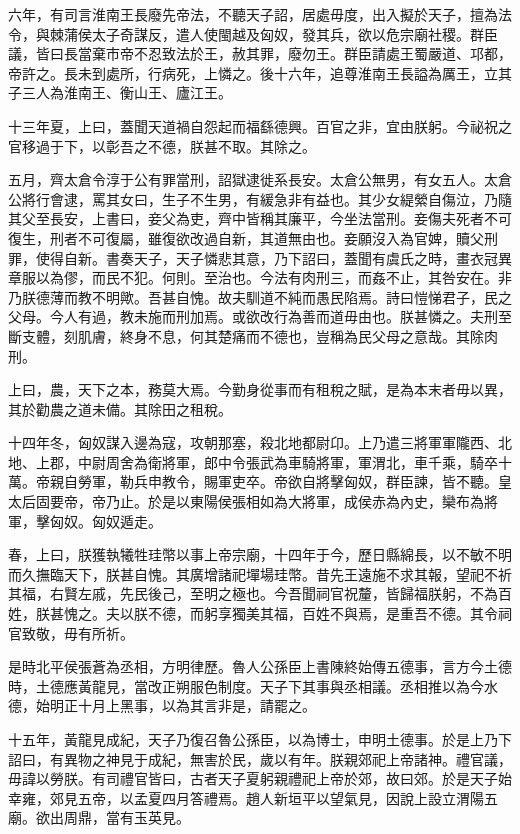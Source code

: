 六年，有司言淮南王長廢先帝法，不聽天子詔，居處毋度，出入擬於天子，擅為法令，與棘蒲侯太子奇謀反，遣人使閩越及匈奴，發其兵，欲以危宗廟社稷。群臣議，皆曰長當棄市帝不忍致法於王，赦其罪，廢勿王。群臣請處王蜀嚴道、邛都，帝許之。長未到處所，行病死，上憐之。後十六年，追尊淮南王長謚為厲王，立其子三人為淮南王、衡山王、廬江王。

十三年夏，上曰，蓋聞天道禍自怨起而福繇德興。百官之非，宜由朕躬。今祕祝之官移過于下，以彰吾之不德，朕甚不取。其除之。

五月，齊太倉令淳于公有罪當刑，詔獄逮徙系長安。太倉公無男，有女五人。太倉公將行會逮，罵其女曰，生子不生男，有緩急非有益也。其少女緹縈自傷泣，乃隨其父至長安，上書曰，妾父為吏，齊中皆稱其廉平，今坐法當刑。妾傷夫死者不可復生，刑者不可復屬，雖復欲改過自新，其道無由也。妾願沒入為官婢，贖父刑罪，使得自新。書奏天子，天子憐悲其意，乃下詔曰，蓋聞有虞氏之時，畫衣冠異章服以為僇，而民不犯。何則。至治也。今法有肉刑三，而姦不止，其咎安在。非乃朕德薄而教不明歟。吾甚自愧。故夫馴道不純而愚民陷焉。詩曰愷悌君子，民之父母。今人有過，教未施而刑加焉。或欲改行為善而道毋由也。朕甚憐之。夫刑至斷支體，刻肌膚，終身不息，何其楚痛而不德也，豈稱為民父母之意哉。其除肉刑。

上曰，農，天下之本，務莫大焉。今勤身從事而有租稅之賦，是為本末者毋以異，其於勸農之道未備。其除田之租稅。

十四年冬，匈奴謀入邊為寇，攻朝那塞，殺北地都尉卬。上乃遣三將軍軍隴西、北地、上郡，中尉周舍為衛將軍，郎中令張武為車騎將軍，軍渭北，車千乘，騎卒十萬。帝親自勞軍，勒兵申教令，賜軍吏卒。帝欲自將擊匈奴，群臣諫，皆不聽。皇太后固要帝，帝乃止。於是以東陽侯張相如為大將軍，成侯赤為內史，欒布為將軍，擊匈奴。匈奴遁走。

春，上曰，朕獲執犧牲珪幣以事上帝宗廟，十四年于今，歷日縣綿長，以不敏不明而久撫臨天下，朕甚自愧。其廣增諸祀墠場珪幣。昔先王遠施不求其報，望祀不祈其福，右賢左戚，先民後己，至明之極也。今吾聞祠官祝釐，皆歸福朕躬，不為百姓，朕甚愧之。夫以朕不德，而躬享獨美其福，百姓不與焉，是重吾不德。其令祠官致敬，毋有所祈。

是時北平侯張蒼為丞相，方明律歷。魯人公孫臣上書陳終始傳五德事，言方今土德時，土德應黃龍見，當改正朔服色制度。天子下其事與丞相議。丞相推以為今水德，始明正十月上黑事，以為其言非是，請罷之。

十五年，黃龍見成紀，天子乃復召魯公孫臣，以為博士，申明土德事。於是上乃下詔曰，有異物之神見于成紀，無害於民，歲以有年。朕親郊祀上帝諸神。禮官議，毋諱以勞朕。有司禮官皆曰，古者天子夏躬親禮祀上帝於郊，故曰郊。於是天子始幸雍，郊見五帝，以孟夏四月答禮焉。趙人新垣平以望氣見，因說上設立渭陽五廟。欲出周鼎，當有玉英見。

